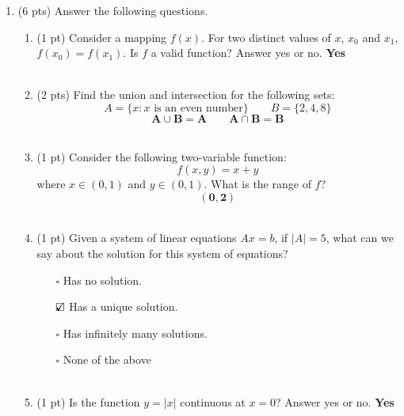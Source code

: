 \documentclass{./../../Latex/tests}
\begin{document}
\thispagestyle{plain}

\vspace{0.5em}

\begin{enumerate}
\item (6 pts) Answer the following questions. 
\begin{enumerate}
\item (1 pt) Consider a mapping $f(x)$. For two distinct values of $x$, $x_0$ and $x_1$, $f(x_0) = f(x_1)$. Is $f$ a valid function? Answer yes or no. \textbf{Yes} \\~\\
\item (2 pts) Find the union and intersection for the following sets:
$$ A = \{x: x \text{ is an even number} \} \quad \quad B = \{2, 4, 8 \} $$ 
$$\mathbf{ A \cup B = A \quad \quad A \cap B = B }$$ \\
\item (1 pt) Consider the following two-variable function: 
  $$ f(x,y) = x+y $$
  where $x \in (0,1)$ and $y \in (0,1)$. What is the range of $f$? $$\mathbf{(0,2)}$$ \\
 
\item (1 pt) Given a system of linear equations $A x = b$, if $|A|=5$, what can we say about the solution for this system of equations?
\begin{itemize}
	\item[$\square$] Has no solution. 
	\item[$\text{\rlap{$\checkmark$}}\square$] Has a unique solution.
	\item[$\square$] Has infinitely many solutions.
	\item[$\square$] None of the above \\~\\
\end{itemize}  
\item (1 pt) Is the function $y=|x|$ continuous at $x=0$? Answer yes or no. \textbf{Yes}
\end{enumerate} 


\end{enumerate}
\end{document}
